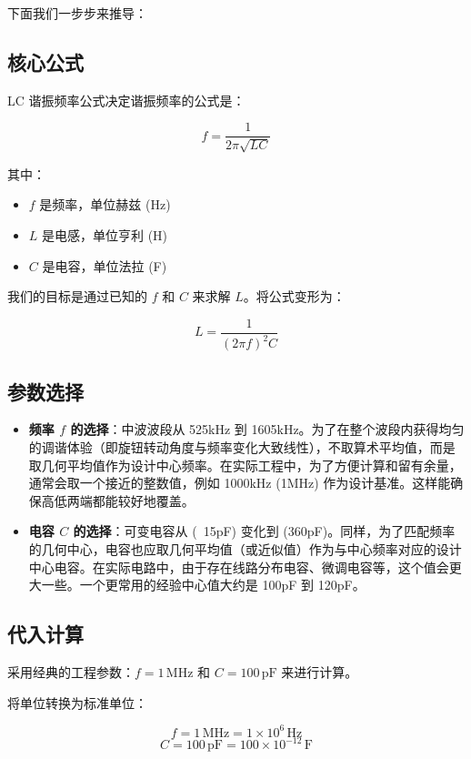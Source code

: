 \documentclass[12pt,UTF8]{ctexbook}
\begin{document}
下面我们一步步来推导：

\subsection{核心公式}

LC 谐振频率公式决定谐振频率的公式是：

\[ f = \frac{1}{2\pi\sqrt{LC}} \]

其中：

\begin{itemize}[leftmargin=2cm]
	\item \( f \) 是频率，单位赫兹 (Hz)
	\item \( L \) 是电感，单位亨利 (H)
	\item \( C \) 是电容，单位法拉 (F)
\end{itemize}

我们的目标是通过已知的 \( f \) 和 \( C \) 来求解 \( L \)。将公式变形为：

\[ L = \frac{1}{(2\pi f)^2 C} \]

\subsection{参数选择}

\begin{itemize}[leftmargin=2cm]
	\item \textbf{频率 \( f \) 的选择}：中波波段从 525kHz 到 1605kHz。为了在整个波段内获得均匀的调谐体验（即旋钮转动角度与频率变化大致线性），不取算术平均值，而是取几何平均值作为设计中心频率。在实际工程中，为了方便计算和留有余量，通常会取一个接近的整数值，例如 1000kHz (1MHz) 作为设计基准。这样能确保高低两端都能较好地覆盖。
	\item \textbf{电容 \( C \) 的选择}：可变电容从 (~15pF) 变化到 (360pF)。同样，为了匹配频率的几何中心，电容也应取几何平均值（或近似值）作为与中心频率对应的设计中心电容。在实际电路中，由于存在线路分布电容、微调电容等，这个值会更大一些。一个更常用的经验中心值大约是 100pF 到 120pF。
\end{itemize}

\subsection{代入计算}

采用经典的工程参数：\( f = 1 \, \text{MHz} \) 和 \( C = 100 \, \text{pF} \) 来进行计算。

将单位转换为标准单位：

\[ f = 1 \, \text{MHz} = 1 \times 10^6 \, \text{Hz} \]
\[ C = 100 \, \text{pF} = 100 \times 10^{-12} \, \text{F} \]
\end{document}
